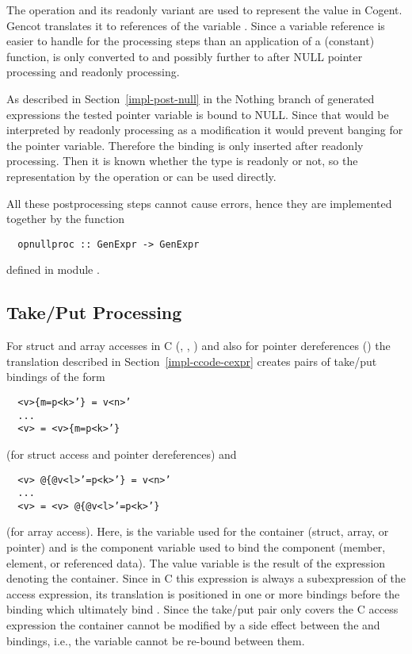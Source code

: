 The operation  and its readonly variant  are used to represent the value  in Cogent.
Gencot translates it to references of the variable . Since a variable reference is easier to handle
for the processing steps than an application of a (constant) function,  is only converted to 
and possibly further to  after NULL pointer processing and readonly processing.

As described in Section~\ref{impl-post-null} in the Nothing branch of generated  expressions the tested pointer
variable is bound to NULL. Since that would be interpreted by readonly processing as a modification it would prevent
banging for the pointer variable. Therefore the binding is only inserted after readonly processing. Then it is known
whether the type is readonly or not, so the representation by the operation  or  can be used directly.

All these postprocessing steps cannot cause errors, hence they are implemented together by the function

\begin{verbatim}
  opnullproc :: GenExpr -> GenExpr
\end{verbatim}
defined in module .

\subsection{Take/Put Processing}
\label{impl-post-takeput}

For struct and array accesses in C (, , ) and also for pointer dereferences ()
the translation described in Section~\ref{impl-ccode-cexpr} creates pairs of take/put bindings of the form
\begin{verbatim}
  <v>{m=p<k>’} = v<n>’
  ...
  <v> = <v>{m=p<k>’}
\end{verbatim}
(for struct access and pointer dereferences) and
\begin{verbatim}
  <v> @{@v<l>’=p<k>’} = v<n>’
  ...
  <v> = <v> @{@v<l>’=p<k>’}
\end{verbatim}
(for array access). Here,  is the variable used for the container (struct, array, or pointer) and  is the
component variable used to bind the component (member, element, or referenced data). The value variable  is the result
of the expression denoting the container. Since in C this expression is always a subexpression of the access expression, its
translation is positioned in one or more bindings before the  binding which ultimately bind .
Since the take/put pair only covers the C access expression the container cannot be modified by a side effect between the
 and  bindings, i.e., the variable  cannot be re-bound between them.

